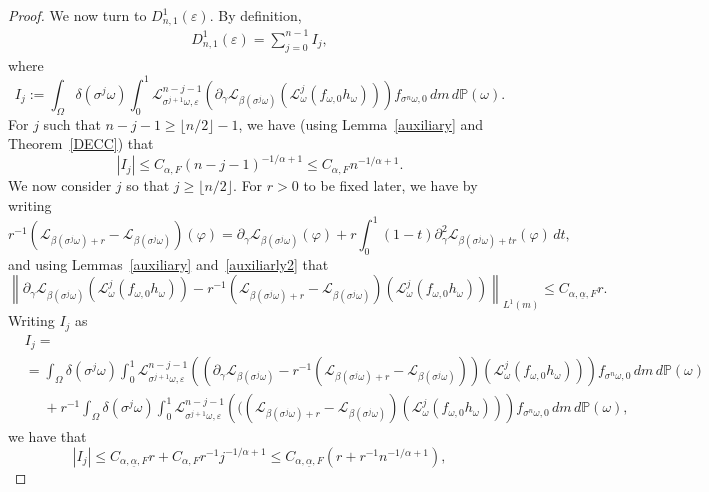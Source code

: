 \documentclass[12pt,reqno,a4paper]{article}
\newcommand{\ve}{\varepsilon}
\begin{document}
\begin{proof}
	
	We now turn to $D_{n,1}^1(\varepsilon)$. By definition,
	\[
	\begin{split}
		D_{n,1}^1(\varepsilon)
		=\sum_{j=0}^{n-1}I_j, 
	\end{split}
	\]
	where 
	\[
	I_j:=  \int_\Omega \delta (\sigma^j \omega) \int_0^1 \mathcal L_{\sigma^{j+1}\omega, \varepsilon}^{n-j-1}\left (\partial_\gamma \mathcal L_{\beta(\sigma^j \omega)}(\mathcal L_\omega^j(f_{\omega, 0}h_\omega))\right )f_{\sigma^n \omega,0}\, dm\, d\mathbb P(\omega).
	\]
	For $j$ such that $n-j-1\ge \lfloor n/2\rfloor-1$, we have (using Lemma~\ref{auxiliary} and Theorem~\ref{DECC}) that 
	\begin{equation}\label{ij1}
		|I_j| \le C_{\alpha, F} (n-j-1)^{-1/\alpha+1}\le C_{\alpha, F} n^{-1/\alpha+1}.
	\end{equation}
	We now consider $j$ so that $j\ge \lfloor n/2\rfloor$. For $r>0$ to be fixed later, we have by writing 
	\[
	r^{-1}(\mathcal L_{\beta(\sigma^j \omega)+r}-\mathcal L_{\beta (\sigma^j \omega)})(\varphi)=\partial_\gamma \mathcal L_{\beta(\sigma^j \omega)}(\varphi)+r\int_0^1(1-t)\partial_\gamma^2 \mathcal L_{\beta(\sigma^j \omega)+tr}(\varphi)\, dt,
	\]
	and using Lemmas~\ref{auxiliary} and~\ref{auxiliarly2} 
	that
	\[
	\left \| \partial_\gamma \mathcal L_{\beta(\sigma^j \omega)}(\mathcal L_\omega^j(f_{\omega, 0}h_\omega))-r^{-1}(\mathcal L_{\beta(\sigma^j \omega)+r}-\mathcal L_{\beta (\sigma^j \omega)})(\mathcal L_\omega^j (f_{\omega, 0}h_\omega))\right \|_{L^1(m)} \le C_{\alpha, \underline{\alpha}, F}r.
	\]
	Writing $I_j$ as 
	\[
	\begin{split}
		&I_j=\\
		&=\int_\Omega \delta(\sigma^j \omega)\int_0^1 \mathcal L_{\sigma^{j+1}\omega, \ve }^{n-j-1}\left ( (\partial_\gamma \mathcal L_{\beta( \sigma^j \omega)}-r^{-1}(\mathcal L_{\beta(\sigma^j \omega)+r}-\mathcal L_{\beta (\sigma^j \omega)}))(\mathcal L_\omega^j (f_{\omega, 0}h_\omega))\right )f_{\sigma^n \omega, 0}\, dm\, d\mathbb P(\omega)\\
		&\phantom{=}+r^{-1}\int_\Omega \delta(\sigma^j \omega)\int_0^1 \mathcal L_{\sigma^{j+1}\omega, \ve}^{n-j-1}\left (((\mathcal L_{\beta(\sigma^j \omega)+r}-\mathcal L_{\beta (\sigma^j \omega)})(\mathcal L_\omega^j (f_{\omega, 0}h_\omega))\right )f_{\sigma^n \omega, 0}\, dm\, d\mathbb P(\omega),
	\end{split}
	\]
	we have that 
	\begin{equation}\label{upto}
		|I_j| \le C_{\alpha, \underline{\alpha}, F}r+C_{\alpha, F}r^{-1}j^{-1/\alpha+1}\le C_{\alpha, \underline{\alpha}, F}(r+r^{-1}n^{-1/\alpha+1}),

\end{equation}
\end{proof}
\end{document}
